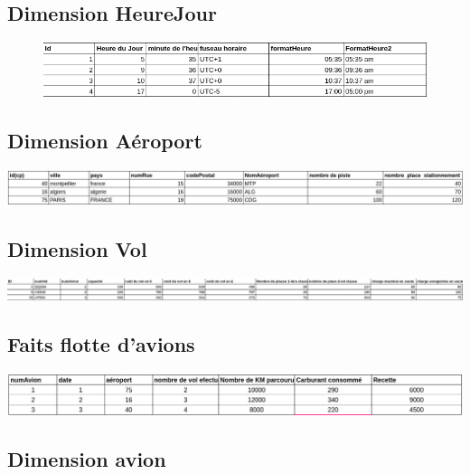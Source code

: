 \documentclass[oneside,13pt,a4paper]{article}
\begin{document}
\subsection{Dimension HeureJour}
\begin{figure}[h]
  \centering
  \includegraphics[width=1\textwidth]{img/heureJour.png}
  
\end{figure}



\subsection{Dimension Aéroport}


  
  \includegraphics[width=1\textwidth]{img/aeroport.png}
  


\subsection{Dimension Vol}


  
  \includegraphics[width=1\textwidth]{img/vol.png}
  




\subsection{Faits flotte d'avions}

  
  \includegraphics[width=1\textwidth]{img/faitsStockAvions.png}
 


\subsection{Dimension avion}
\end{document}
